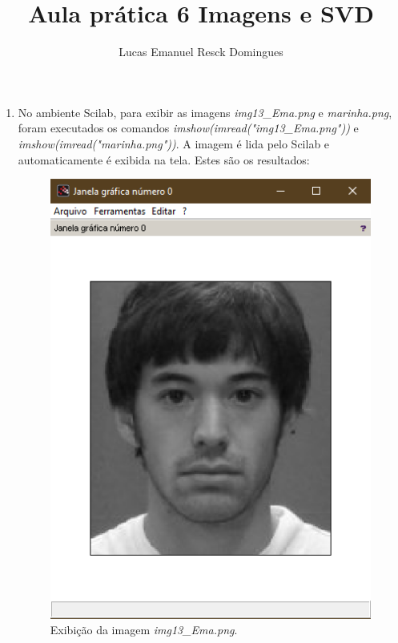 \documentclass[11pt]{article}
\begin{document}
    \author{Lucas Emanuel Resck Domingues}
    \title{Aula prática 6
    \medbreak
    \large Imagens e SVD}
    \maketitle
    
    \medskip
    
    \begin{enumerate}
    
        \item %
        
            No ambiente Scilab, para exibir as imagens \textit{img13\_Ema.png} e \textit{marinha.png}, foram executados os comandos \textit{imshow(imread("img13\_Ema.png"))} e \textit{imshow(imread("marinha.png"))}. A imagem é lida pelo Scilab e automaticamente é exibida na tela. Estes são os resultados:
        
            \begin{figure}[H]
                \centering                \includegraphics[scale=0.9]{1-1}
                \caption{Exibição da imagem \textit{img13\_Ema.png}.}
            \end{figure}
        

\end{enumerate}
\end{document}
